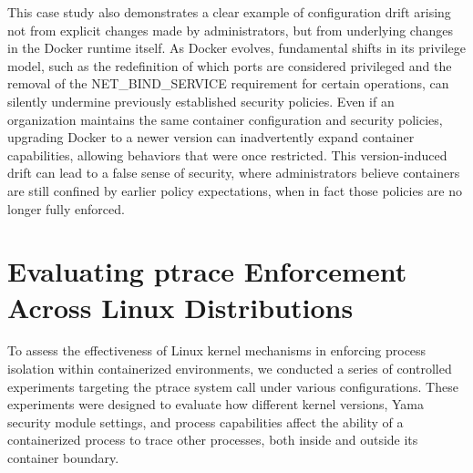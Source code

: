 \begin{doublespace}
This case study also demonstrates a clear example of configuration drift arising not from explicit changes made by administrators, but from underlying changes in the Docker runtime itself. As Docker evolves, fundamental shifts in its privilege model, such as the redefinition of which ports are considered privileged and the removal of the NET\_BIND\_SERVICE requirement for certain operations, can silently undermine previously established security policies. Even if an organization maintains the same container configuration and security policies, upgrading Docker to a newer version can inadvertently expand container capabilities, allowing behaviors that were once restricted. This version-induced drift can lead to a false sense of security, where administrators believe containers are still confined by earlier policy expectations, when in fact those policies are no longer fully enforced.



















































\section{Evaluating ptrace Enforcement Across Linux Distributions}
\label{sec:evaluating-ptrace-enforcement-across-linux-distributions}

To assess the effectiveness of Linux kernel mechanisms in enforcing process isolation within containerized environments, we conducted a series of controlled experiments targeting the ptrace system call under various configurations. These experiments were designed to evaluate how different kernel versions, Yama security module settings, and process capabilities affect the ability of a containerized process to trace other processes, both inside and outside its container boundary.


\end{doublespace}
